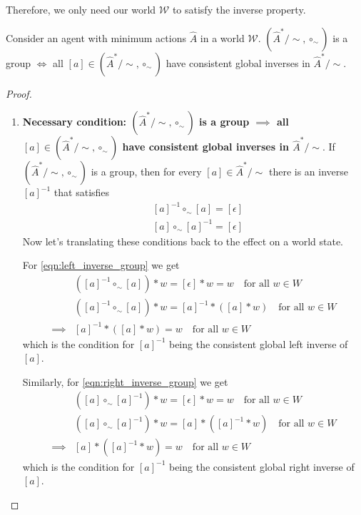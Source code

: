 Therefore, we only need our world $\mathscr{W}$ to satisfy the inverse property.

\begin{proposition}
    Consider an agent with minimum actions $\hat{A}$ in a world $\mathscr{W}$.
    $(\hat{A}^{*}/\sim, \circ_{\sim})$ is a group $\iff$ all $[a] \in (\hat{A}^{*}/\sim, \circ_{\sim})$ have consistent global inverses in $\hat{A}^{*}/\sim$.
\end{proposition}
\begin{proof}
\begin{enumerate}[(1)]
    \item \textbf{Necessary condition: $(\hat{A}^{*}/\sim, \circ_{\sim})$ is a group $\implies$ all $[a] \in (\hat{A}^{*}/\sim, \circ_{\sim})$ have consistent global inverses in $\hat{A}^{*}/\sim$}.
    If $(\hat{A}^{*}/\sim, \circ_{\sim})$ is a group, then for every $[a] \in \hat{A}^{*}/\sim$ there is an inverse $[a]^{-1}$ that satisfies
    \begin{align}
        & [a]^{-1} \circ_{\sim} [a] = [\epsilon]
        \label{eqn:left_inverse_group}\\
        & [a] \circ_{\sim} [a]^{-1} = [\epsilon]
        \label{eqn:right_inverse_group}
    \end{align}
    Now let's translating these conditions back to the effect on a world state.
    
    For \cref{eqn:left_inverse_group} we get
    \begin{align}
        & ([a]^{-1} \circ_{\sim} [a]) \ast w = [\epsilon] \ast w = w \quad \text{for all $w \in W$} \\
        & ([a]^{-1} \circ_{\sim} [a]) \ast w = [a]^{-1} \ast ([a] \ast w) \quad \text{for all $w \in W$} \\
        \implies & [a]^{-1} \ast ([a] \ast w) = w \quad \text{for all $w \in W$}
    \end{align}
    which is the condition for $[a]^{-1}$ being the consistent global left inverse of $[a]$.
    
    Similarly, for \cref{eqn:right_inverse_group} we get
    \begin{align}
        & ([a] \circ_{\sim} [a]^{-1}) \ast w = [\epsilon] \ast w = w \quad \text{for all $w \in W$} \\
        & ([a] \circ_{\sim} [a]^{-1}) \ast w = [a] \ast ([a]^{-1} \ast w) \quad \text{for all $w \in W$} \\
        \implies & [a] \ast ([a]^{-1} \ast w) = w \quad \text{for all $w \in W$}
    \end{align}
    which is the condition for $[a]^{-1}$ being the consistent global right inverse of $[a]$.


\end{enumerate}
\end{proof}
